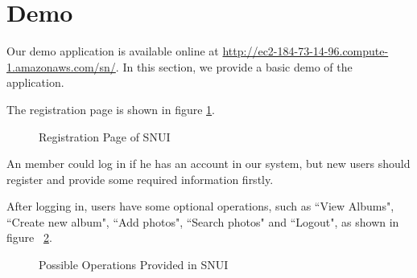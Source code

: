\documentclass[10pt,twocolumn,letterpaper]{article}
\begin{document}
\section{Demo}
Our demo application is available online at \url{http://ec2-184-73-14-96.compute-1.amazonaws.com/sn/}. In this section, we provide a basic demo of the application.

The registration page is shown in figure \ref{fig:registration}.

\begin{figure}[t]
\begin{center}
\end{center}
\caption{Registration Page of SNUI}
\label{fig:registration}
\end{figure}

An member could log in if he has an account in our system, but new users should register and provide some required information firstly.

After logging in, users have some optional operations, such as ``View Albums", ``Create new album", ``Add photos", ``Search photos" and ``Logout", as shown in figure ~\ref{fig:operations}.

\begin{figure}[t]
\begin{center}
\end{center}
\caption{Possible Operations Provided in SNUI}
\label{fig:operations}
\end{figure}
\end{document}
